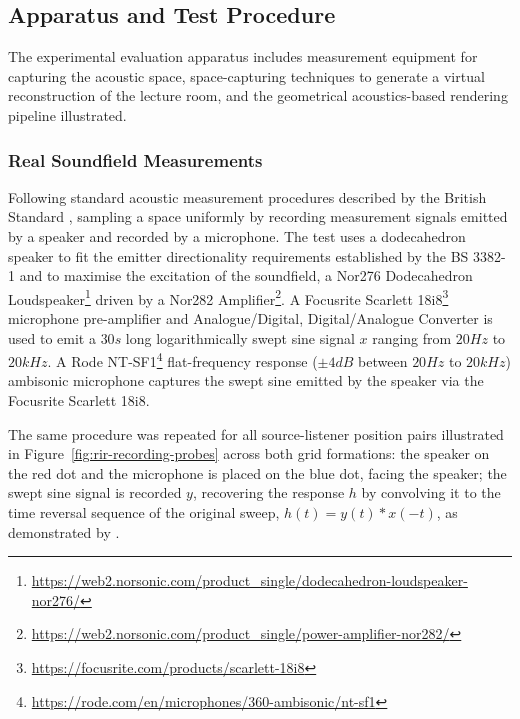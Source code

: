\subsection{Apparatus and Test Procedure}
\label{sec:acoustic_eval_procedure}
The experimental evaluation apparatus includes measurement equipment for capturing the acoustic space, space-capturing techniques to generate a virtual reconstruction of the lecture room, and the geometrical acoustics-based rendering pipeline illustrated.


\subsubsection{Real Soundfield Measurements}
\label{sec:real_soundfield_measurement}
Following standard acoustic measurement procedures described by the British Standard \cite{bs3382-1}, sampling a space uniformly by recording measurement signals emitted by a speaker and recorded by a microphone. The test uses a dodecahedron speaker to fit the emitter directionality requirements established by the BS 3382-1 and to maximise the excitation of the soundfield, a Nor276 Dodecahedron Loudspeaker\footnote{\url{https://web2.norsonic.com/product_single/dodecahedron-loudspeaker-nor276/}} driven by a Nor282 Amplifier\footnote{\url{https://web2.norsonic.com/product_single/power-amplifier-nor282/}}. A Focusrite Scarlett 18i8\footnote{\url{https://focusrite.com/products/scarlett-18i8}} microphone pre-amplifier and Analogue/Digital, Digital/Analogue Converter is used to emit a $30s$ long logarithmically swept sine signal $x$ ranging from $20Hz$ to $20kHz$. A Rode NT-SF1\footnote{\url{https://rode.com/en/microphones/360-ambisonic/nt-sf1}} flat-frequency response ($\pm4dB$ between $20Hz$ to $20kHz$) ambisonic microphone captures the swept sine emitted by the speaker via the Focusrite Scarlett 18i8. \par
The same procedure was repeated for all source-listener position pairs illustrated in Figure~\ref{fig:rir-recording-probes} across both grid formations: the speaker on the red dot and the microphone is placed on the blue dot, facing the speaker; the swept sine signal is recorded $y$, recovering the response $h$ by convolving it to the time reversal sequence of the original sweep, $h(t) = y(t) * x(-t)$, as demonstrated by \cite{farina07}. \par

